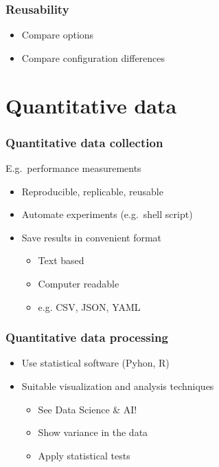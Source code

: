 \documentclass[aspectratio=169]{beamer}
\begin{document}
\begin{frame}
  \frametitle{Reusability}


  \bigskip

  \begin{itemize}
    \item Compare options
    \item Compare configuration differences
  \end{itemize}

\end{frame}

\section{Quantitative data}

\begin{frame}
  \frametitle{Quantitative data collection}

  E.g.\ performance measurements

  \begin{itemize}
    \item Reproducible, replicable, reusable
    \item Automate experiments (e.g.\ shell script)
    \item Save results in convenient format
          \begin{itemize}
            \item Text based
            \item Computer readable
            \item e.g. CSV, JSON, YAML
          \end{itemize}
  \end{itemize}

\end{frame}

\begin{frame}
  \frametitle{Quantitative data processing}

  \begin{itemize}
    \item Use statistical software (Pyhon, R)
    \item Suitable visualization and analysis techniques
          \begin{itemize}
            \item See Data Science \& AI!
            \item Show variance in the data
            \item Apply statistical tests
          \end{itemize}
  \end{itemize}

\end{frame}
\end{document}
